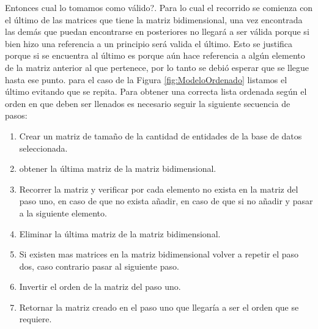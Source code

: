 Entonces cual lo tomamos como v\'alido?.
Para lo cual el  recorrido se comienza con el \'ultimo de las matrices que tiene la matriz bidimensional, una vez encontrada las dem\'as que puedan encontrarse en posteriores no llegar\'a a ser v\'alida porque si bien hizo una referencia a un principio ser\'a valida el \'ultimo. Esto se justifica porque si se encuentra al \'ultimo es porque a\'un hace referencia a alg\'un elemento de la matriz anterior al que pertenece, por lo tanto se debi\'o esperar que se llegue hasta ese punto. para el caso de la Figura \ref{fig:ModeloOrdenado} listamos el \'ultimo evitando que se repita.
Para obtener una correcta lista ordenada seg\'un el orden en que deben ser llenados es necesario seguir la siguiente secuencia de pasos:
\begin{enumerate}
\item Crear un matriz de tama\~no de la cantidad de entidades de la base de datos seleccionada.
\item obtener la \'ultima matriz de la matriz bidimensional.
\item Recorrer la matriz y verificar por cada elemento no exista en la matriz del paso uno, en caso de que no exista a\~nadir, en caso de que si no a\~nadir y pasar a la siguiente elemento.
\item Eliminar la \'ultima matriz de la matriz bidimensional.
\item Si existen mas matrices en la matriz bidimensional volver a repetir el paso dos, caso contrario pasar al siguiente paso.
\item Invertir el orden de la matriz del paso uno.
\item Retornar la matriz creado en el paso uno que llegar\'ia a ser el orden que se requiere.
\end{enumerate}
